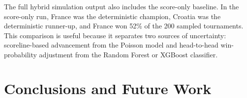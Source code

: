 \documentclass[11pt]{article}
\begin{document}
\begin{table}[h!]
\centering
\small
{}
\caption{Comparison of the tree-based models on the chronological hold-out set and 200-simulation bracket output. Bold values identify the best value within the two-model comparison for each metric.}
\label{tab:tree_model_comparison}
\end{table}

The full hybrid simulation output also includes the score-only baseline. In the score-only run, France was the deterministic champion, Croatia was the deterministic runner-up, and France won 52\% of the 200 sampled tournaments. This comparison is useful because it separates two sources of uncertainty: scoreline-based advancement from the Poisson model and head-to-head win-probability adjustment from the Random Forest or XGBoost classifier.

\begin{table}[h!]
\centering
\small
{}
\caption{Comparison of tournament simulation outputs across the score-only baseline and the two hybrid winner-model workflows.}
\label{tab:hybrid_simulation_comparison}
\end{table}

\section{Conclusions and Future Work}
\end{document}
